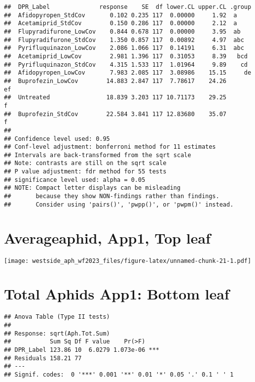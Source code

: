 \documentclass[
]{article}
\begin{document}
\begin{verbatim}
##  DPR_Label              response    SE  df lower.CL upper.CL .group 
##  Afidopyropen_StdCov       0.102 0.235 117  0.00000     1.92  a     
##  Acetamiprid_StdCov        0.150 0.286 117  0.00000     2.12  a     
##  Flupyradifurone_LowCov    0.844 0.678 117  0.00000     3.95  ab    
##  Flupyradifurone_StdCov    1.350 0.857 117  0.00892     4.97  abc   
##  Pyrifluquinazon_LowCov    2.086 1.066 117  0.14191     6.31  abc   
##  Acetamiprid_LowCov        2.981 1.396 117  0.31053     8.39   bcd  
##  Pyrifluquinazon_StdCov    4.315 1.533 117  1.01964     9.89    cd  
##  Afidopyropen_LowCov       7.983 2.085 117  3.08986    15.15     de 
##  Buprofezin_LowCov        14.883 2.847 117  7.78617    24.26      ef
##  Untreated                18.839 3.203 117 10.71173    29.25       f
##  Buprofezin_StdCov        22.584 3.841 117 12.83680    35.07       f
## 
## Confidence level used: 0.95 
## Conf-level adjustment: bonferroni method for 11 estimates 
## Intervals are back-transformed from the sqrt scale 
## Note: contrasts are still on the sqrt scale 
## P value adjustment: fdr method for 55 tests 
## significance level used: alpha = 0.05 
## NOTE: Compact letter displays can be misleading
##       because they show NON-findings rather than findings.
##       Consider using 'pairs()', 'pwpp()', or 'pwpm()' instead.
\end{verbatim}

\hypertarget{averageaphid-app1-top-leaf}{%
\section{Averageaphid, App1, Top
leaf}\label{averageaphid-app1-top-leaf}}

\texttt{[image: westside\_aph\_wf2023\_files/figure-latex/unnamed-chunk-21-1.pdf]}

\hypertarget{total-aphids-app1-bottom-leaf}{%
\section{Total Aphids App1: Bottom
leaf}\label{total-aphids-app1-bottom-leaf}}

\begin{verbatim}
## Anova Table (Type II tests)
## 
## Response: sqrt(Aph.Tot.Sum)
##           Sum Sq Df F value    Pr(>F)    
## DPR_Label 123.86 10  6.0279 1.073e-06 ***
## Residuals 158.21 77                      
## ---
## Signif. codes:  0 '***' 0.001 '**' 0.01 '*' 0.05 '.' 0.1 ' ' 1
\end{verbatim}
\end{document}
